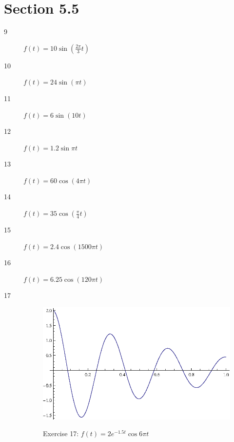 \documentclass{exam}
\begin{document}
    \section{Section 5.5}
    \begin{description}
      \item[9] $f(t) = 10 \sin \left( \frac{2 \pi}{3} t \right)$

      \item[10] $f(t) = 24 \sin \left( \pi t \right)$

      \item[11] $f(t) = 6 \sin \left( 10 t \right)$

      \item[12] $f(t) = 1.2 \sin \pi t$
        
      \item[13] $f(t) = 60 \cos \left( 4 \pi t \right)$

      \item[14] $f(t) = 35 \cos \left( \frac{\pi}{4} t \right)$

      \item[15] $f(t) = 2.4 \cos \left( 1500 \pi t \right)$

      \item[16] $f(t) = 6.25 \cos \left( 120 \pi t \right)$

      \item[17]
        \begin{figure}[H]
          \centering
          \includegraphics{exercise17.eps}

          Exercise 17: $f(t) = 2 e^{-1.5t} \cos 6 \pi t$
        \end{figure}


\end{description}
\end{document}
